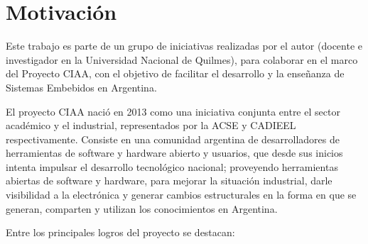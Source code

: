 \section{Motivación}
\label{sec:motivacion}

Este trabajo es parte de un grupo de iniciativas realizadas por el autor (docente e investigador en la Universidad Nacional de Quilmes), para colaborar en el marco del Proyecto CIAA, con el objetivo de facilitar el desarrollo y la enseñanza de Sistemas Embebidos en Argentina.

El proyecto CIAA nació en 2013 como una iniciativa conjunta entre el sector académico y el industrial, representados por la ACSE \citep{ACSE} y CADIEEL \citep{CADIEEL} respectivamente. Consiste en una comunidad argentina de desarrolladores de herramientas de software y hardware abierto y usuarios, que desde sus inicios intenta impulsar el desarrollo tecnológico nacional; proveyendo herramientas abiertas de software y hardware, para mejorar la situación industrial, darle visibilidad a la electrónica y generar cambios estructurales en la forma en que se generan, comparten y utilizan los conocimientos en Argentina.


Entre los principales logros del proyecto se destacan:

